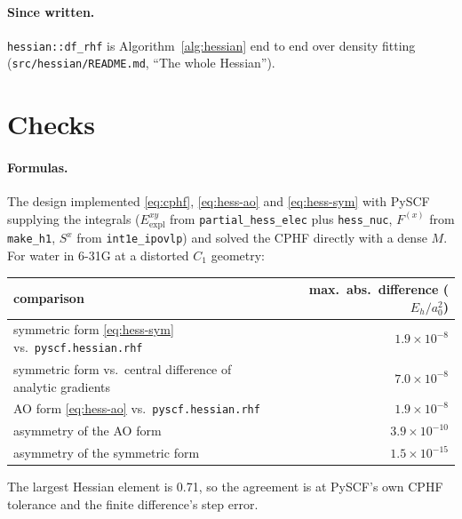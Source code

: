 \documentclass[11pt]{article}
\newcommand{\code}[1]{\texttt{#1}}
\newcommand{\Fsk}[1]{F^{(#1)}}
\newcommand{\Exy}{E^{xy}}
\begin{document}
\paragraph{Since written.} \code{hessian::df\_rhf} is
Algorithm~\ref{alg:hessian} end to end over density fitting
(\code{src/hessian/README.md}, ``The whole Hessian'').

\section{Checks}
\label{sec:rhf-checks}

\paragraph{Formulas.} The design implemented \eqref{eq:cphf},
\eqref{eq:hess-ao} and \eqref{eq:hess-sym} with PySCF supplying the
integrals ($\Exy_{\mathrm{expl}}$ from \code{partial\_hess\_elec} plus
\code{hess\_nuc}, $\Fsk{x}$ from \code{make\_h1}, $S^x$ from
\code{int1e\_ipovlp}) and solved the CPHF directly with a dense $M$. For
water in 6-31G at a distorted $C_1$ geometry:

\begin{center}
\begin{tabular}{@{}lr@{}}
\toprule
comparison & max.\ abs.\ difference ($E_h/a_0^2$) \\
\midrule
symmetric form \eqref{eq:hess-sym} vs.\ \code{pyscf.hessian.rhf} & $1.9\times10^{-8}$ \\
symmetric form vs.\ central difference of analytic gradients & $7.0\times10^{-8}$ \\
AO form \eqref{eq:hess-ao} vs.\ \code{pyscf.hessian.rhf} & $1.9\times10^{-8}$ \\
asymmetry of the AO form & $3.9\times10^{-10}$ \\
asymmetry of the symmetric form & $1.5\times10^{-15}$ \\
\bottomrule
\end{tabular}
\end{center}

The largest Hessian element is 0.71, so the agreement is at PySCF's own
CPHF tolerance and the finite difference's step error.
\end{document}
